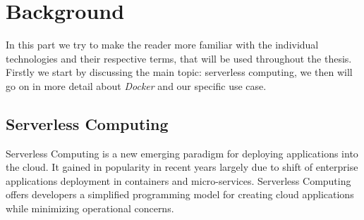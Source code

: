 \section{Background}

In this part we try to make the reader more familiar with the individual technologies and their
respective terms, that will be used throughout the thesis. Firstly we start by discussing the main
topic: serverless computing, we then will go on in more detail about \textit{Docker} and our
specific use case.

\subsection{Serverless Computing}

Serverless Computing is a new emerging paradigm for deploying applications into the cloud. It gained
in popularity in recent years largely due to shift of enterprise applications deployment in
containers and micro-services. Serverless Computing offers developers a simplified programming model
for creating cloud applications while minimizing operational concerns.
